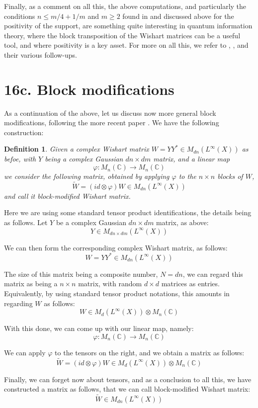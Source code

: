 \documentclass[12pt]{amsbook}
\newtheorem{definition}[theorem]{Definition}
\begin{document}
Finally, as a comment on all this, the above computations, and particularly the conditions $n\leq m/4+1/m$ and $m\geq 2$ found in \cite{bn1} and discussed above for the positivity of the support, are something quite interesting in quantum information theory, where the block transposition of the Wishart matrices can be a useful tool, and where positivity is a key asset. For more on all this, we refer to \cite{aub}, \cite{bn1}, and their various follow-ups.

\section*{16c. Block modifications}

As a continuation of the above, let us discuss now more general block modifications, following the more recent paper \cite{bn2}. We have the following construction:

\begin{definition}
Given a complex Wishart matrix $W=YY^*\in M_{dn}(L^\infty(X))$ as befoe, with $Y$ being a complex Gaussian $dn\times dm$ matrix, and a linear map
$$\varphi:M_n(\mathbb C)\to M_n(\mathbb C)$$
we consider the following matrix, obtained by applying $\varphi$ to the $n\times n$ blocks of $W$,
$$\widetilde{W}=(id\otimes\varphi)W\in M_{dn}(L^\infty(X))$$
and call it block-modified Wishart matrix.
\end{definition}

Here we are using some standard tensor product identifications, the details being as follows. Let $Y$ be a complex Gaussian $dn\times dm$ matrix, as above:
$$Y\in M_{dn\times dm}(L^\infty(X))$$

We can then form the corresponding complex Wishart matrix, as follows: 
$$W=YY^*\in M_{dn}(L^\infty(X))$$

The size of this matrix being a composite number, $N=dn$, we can regard this matrix as being a $n\times n$ matrix, with random $d\times d$ matrices as entries. Equivalently, by using standard tensor product notations, this amounts in regarding $W$ as follows:
$$W\in M_d(L^\infty(X))\otimes M_n(\mathbb C)$$

With this done, we can come up with our linear map, namely:
$$\varphi:M_n(\mathbb C)\to M_n(\mathbb C)$$

We can apply $\varphi$ to the tensors on the right, and we obtain a matrix as follows:
$$\widetilde{W}=(id\otimes\varphi)W\in M_d(L^\infty(X))\otimes M_n(\mathbb C)$$

Finally, we can forget now about tensors, and as a conclusion to all this, we have constructed a matrix as follows, that we can call block-modified Wishart matrix:
$$\widetilde{W}\in M_{dn}(L^\infty(X))$$
\end{document}
